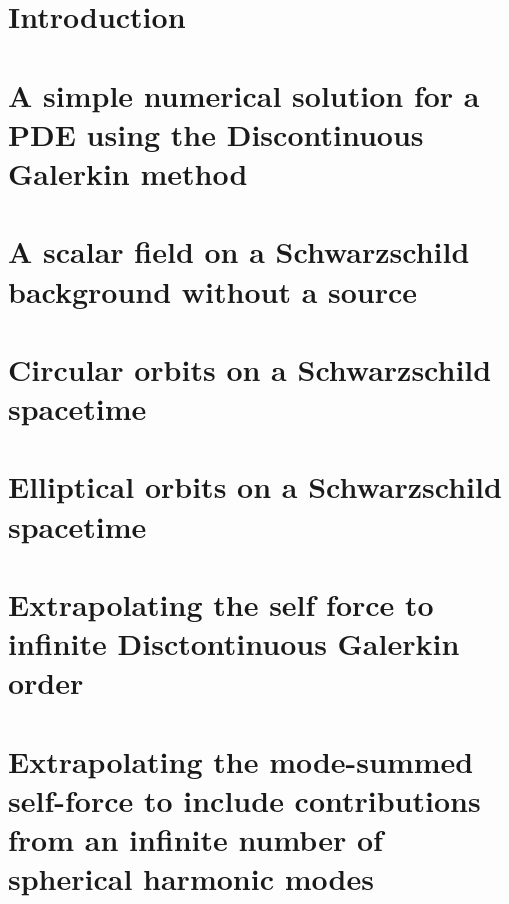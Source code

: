 \documentclass[12pt,letterpaper]{lsuetd}
\begin{document}
\singlespacing
\setlength{\textfloatsep}{12pt plus 2pt minus 2pt}
\setlength{\intextsep}{6pt plus 2pt minus 2pt}
\chapter{Introduction}
\doublespacing

\pagebreak
\singlespacing
\chapter{A simple numerical solution for a PDE using the Discontinuous Galerkin method}
\doublespacing

\pagebreak
\singlespacing
\chapter{A scalar field on a Schwarzschild background without a source}
\doublespacing

\pagebreak
\singlespacing
\chapter{Circular orbits on a Schwarzschild spacetime}
\doublespacing

\label{circularorbit}
\pagebreak
\singlespacing
\chapter{Elliptical orbits on a Schwarzschild spacetime}
\doublespacing

\label{ellipticalorb}
\pagebreak
\singlespacing
\chapter{Extrapolating the self force to infinite Disctontinuous Galerkin order}
\doublespacing

\pagebreak
\singlespacing
\chapter{Extrapolating the mode-summed self-force to include contributions from an infinite number of spherical harmonic modes}
\doublespacing

\pagebreak
\singlespacing
\end{document}
